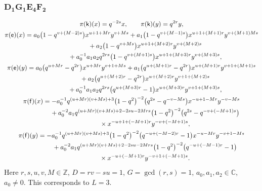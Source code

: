 \documentclass[pdftex]{sigma}
\numberwithin{equation}{section}
\begin{document}
\subsubsection*{$\boldsymbol{D_1G_1E_4F_2}$}
\begin{gather*}
\pi(\mathsf{k})(x)= q^{-2s}x ,\qquad\pi(\mathsf{k})(y)=q^{2r}y ,\\
\pi(\mathsf{e})(x)= a_0\big(1-q^{v+(M-2)s}\big)x^{u+1+Mr}y^{v+Ms}+ a_1\big(1-q^{v+(M-1)s}\big)x^{u+1+(M+1)r}y^{v+(M+1)Ms}\\
\hphantom{\pi(\mathsf{e})(x)=}{}+ a_2\big(1-q^{v+Ms}\big)x^{u+1+(M+2)r}y^{v+(M+2)s}\\
\hphantom{\pi(\mathsf{e})(x)=}{}+ a_0^{-1}a_1a_2q^{2rs}\big(1-q^{v+(M+1)s}\big)x^{u+1+(M+3)r}y^{v+(M+3)s} ,\\
\pi(\mathsf{e})(y)= a_0\big(q^{u+Mr}-q^{2r}\big)x^{u+Mr}y^{v+1+Ms}+ a_1\big(q^{u+(M+1)r}-q^{2r}\big)x^{u+(M+1)r}y^{v+1+(M+1)s}\\
\hphantom{\pi(\mathsf{e})(y)=}{}+ a_2\big(q^{u+(M+2)r}-q^{2r}\big)x^{u+(M+2)r}y^{v+1+(M+2)s}\\
\hphantom{\pi(\mathsf{e})(y)=}{}+ a_0^{-1}a_1a_2q^{2rs}\big(q^{u+(M+3)r}-1\big)x^{u+(M+3)r}y^{v+1+(M+3)s} ,\\
\pi(\mathsf{f})(x)= -a_0^{-1}q^{(u+Mr)(v+Ms)+3}\big(1-q^2\big)^{-2}\big(q^{2s}-q^{-v-Ms}\big)x^{-u+1-Mr}y^{-v-Ms}\\
\hphantom{\pi(\mathsf{f})(x)=}{} + a_0^{-2}a_1q^{(u+Mr)(v+Ms)+2-2su-2Mrs}\big(1-q^2\big)^{-2} \big(q^{2s}-q^{-v+(-M+1)s}\big)\\
\hphantom{\pi(\mathsf{f})(x)=}{}\times x^{-u+1+(-M+1)r}y^{-v+(-M+1)s} ,\\
\pi(\mathsf{f})(y)= -a_0^{-1}q^{(u+Mr)(v+Ms)+3}\big(1-q^2\big)^{-2}\big(q^{-u+(-M-2)r}-1\big)x^{-u-Mr}y^{-v+1-Ms}\\
\hphantom{\pi(\mathsf{f})(y)=}{}+ a_0^{-2}a_1q^{(u+Mr)(v+Ms)+2-2su-2Mrs}\big(1-q^2\big)^{-2}\big(q^{-u+(-M-1)r}-1\big)\\
\hphantom{\pi(\mathsf{f})(y)=}{}\times x^{-u+(-M+1)r}y^{-v+1+(-M+1)s} .
\end{gather*}
Here $r,s,u,v,M\in\mathbb{Z}$, $D=rv-su=1$, $G=\operatorname{gcd}(r,s)=1$, $a_0,a_1,a_2\in\mathbb{C}$, $a_0\ne 0$. This corresponds to $L=3$.
\end{document}
